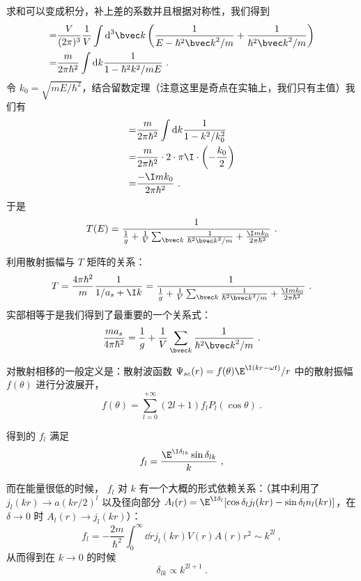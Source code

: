 求和可以变成积分，补上差的系数并且根据对称性，我们得到
\begin{equation}
\begin{split}
=&\frac{V}{(2\pi)^3}\frac{1}{V}\int\text{d}^3{\bvec k}\left(\frac{1}{E-\hbar^2{\bvec k}^2/m} + \frac{1}{\hbar^2{\bvec k}^2/m}\right)\\
=&\frac{m}{2\pi\hbar^2}\int\text{d}k\frac{1}{1-\hbar^2k^2/mE} ~.
\end{split}
\end{equation}
令 $k_0 = \sqrt{mE/\hbar^2}$，结合留数定理（注意这里是奇点在实轴上，我们只有主值）我们有
\begin{equation}
\begin{split}
=&\frac{m}{2\pi\hbar^2}\int\text{d}k\frac{1}{1-k^2/k_0^2} \\
=&\frac{m}{2\pi\hbar^2}\cdot 2\cdot \pi \I \cdot \left(-\frac{k_0}{2}\right)\\
=&\frac{-\I mk_0}{2\pi\hbar^2}~.
\end{split}
\end{equation}
于是
\begin{equation}
T(E) = \dfrac{1}{\frac{1}{g} + \frac{1}{V}\sum_{\bvec k}\frac{1}{\hbar^2{\bvec k}^2/m} + \frac{\I mk_0}{2\pi\hbar^2}}~.
\end{equation}

利用散射振幅与 $T$ 矩阵的关系：
\begin{equation}
T=\frac{4\pi\hbar^2}{m}\frac{1}{1/a_s + \I k} = \dfrac{1}{\frac{1}{g} + \frac{1}{V}\sum_{\bvec k}\frac{1}{\hbar^2{\bvec k}^2/m} + \frac{\I mk_0}{2\pi\hbar^2}}~.
\end{equation}
实部相等于是我们得到了最重要的一个关系式：
\begin{equation}\label{eq_TwoAtF_38}
\frac{ma_s}{4\pi\hbar^2} = \frac{1}{g} + \frac{1}{V}\sum_{\bvec k}\frac{1}{\hbar^2{\bvec k}^2/m}~.
\end{equation}

对散射相移的一般定义是：散射波函数 $\Psi_{sc}(r) = f(\theta) \E^{\I (kr-\omega t)}/r$ 中的散射振幅 $f(\theta)$ 进行分波展开，
\begin{equation}
f(\theta) = \sum_{l=0}^{+\infty} (2l+1) f_l P_l(\cos\theta)~.
\end{equation}

得到的 $f_l$ 满足
\begin{equation}
f_l = \frac{\E^{\I\delta_{lk}}\sin\delta_{lk}}{k}~,
\end{equation}

而在能量很低的时候， $f_l$ 对 $k$ 有一个大概的形式依赖关系：（其中利用了 $j_l(kr)\to a(kr/2)^l$ 以及径向部分 $A_l(r) = \E^{\I\delta_l}[\cos\delta_l j_l(kr) -  \sin\delta_l n_l(kr)]$，在 $\delta\to0$ 时 $A_l(r)\to j_l(kr)$）：
\begin{equation}
f_l = -\frac{2m}{\hbar^2}\int_0^{\infty} \dd{r} j_l(kr)V(r)A(r)r^2 \sim k^{2l}~,
\end{equation}
从而得到在 $k\to0$ 的时候
\begin{equation}
\delta_{lk}\propto k^{2l+1}~.
\end{equation}

